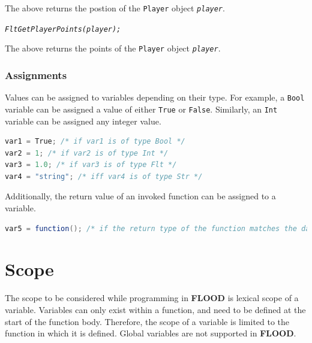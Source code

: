 \documentclass[12pt]{report}
\begin{document}
The above returns the postion of the \texttt{Player} object \textit{\texttt{player}}.

\begin{alltt}\begin{singlespace}
            \textit{Flt GetPlayerPoints(player);}\end{singlespace}
\end{alltt}

The above returns the points of the \texttt{Player} object \textit{\texttt{player}}.

\subsubsection{Assignments}

Values can be assigned to variables depending on their type. For example,  a \texttt{Bool} variable can be assigned a value of either \texttt{True} or \texttt{False}. Similarly, an \texttt{Int} variable can be assigned any integer value. 

\begin{singlespace}
\begin{lstlisting}[language=Java,label=some-code,caption=Assignments]
var1 = True; /* if var1 is of type Bool */
var2 = 1; /* if var2 is of type Int */
var3 = 1.0; /* if var3 is of type Flt */
var4 = "string"; /* iff var4 is of type Str */
\end{lstlisting}
\end{singlespace}

Additionally, the return value of an invoked function can be assigned to a variable.

\begin{singlespace}
\begin{lstlisting}[language=Java,label=some-code,caption=Function assignment]
var5 = function(); /* if the return type of the function matches the data type of var5 */
\end{lstlisting}
\end{singlespace}

\section{Scope}

The scope to be considered while programming in \textbf{FLOOD} is lexical scope of a variable. Variables can only exist within a function, and need to be defined at the start of the function body. Therefore, the scope of a variable is limited to the function in which it is defined. Global variables are not supported in \textbf{FLOOD}.
\end{document}
